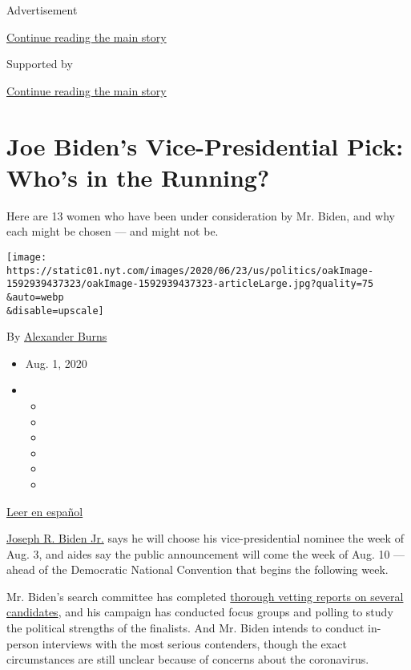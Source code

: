 Advertisement

\protect\hyperlink{after-top}{Continue reading the main story}

Supported by

\protect\hyperlink{after-sponsor}{Continue reading the main story}

\hypertarget{joe-bidens-vice-presidential-pick-whos-in-the-running}{%
\section{Joe Biden's Vice-Presidential Pick: Who's in the
Running?}\label{joe-bidens-vice-presidential-pick-whos-in-the-running}}

Here are 13 women who have been under consideration by Mr. Biden, and
why each might be chosen --- and might not be.

\texttt{[image: https://static01.nyt.com/images/2020/06/23/us/politics/oakImage-1592939437323/oakImage-1592939437323-articleLarge.jpg?quality=75\\\&auto=webp\\\&disable=upscale]}

By \href{https://www.nytimes.com/by/alexander-burns}{Alexander Burns}

\begin{itemize}
\item
  Aug. 1, 2020
\item
  \begin{itemize}
  \item
  \item
  \item
  \item
  \item
  \item
  \end{itemize}
\end{itemize}

\href{https://www.nytimes.com/es/2020/07/29/espanol/estados-unidos/biden-vicepresidente.html}{Leer
en español}

\href{https://www.nytimes.com/interactive/2020/us/elections/joe-biden.html}{Joseph
R. Biden Jr.} says he will choose his vice-presidential nominee the week
of Aug. 3, and aides say the public announcement will come the week of
Aug. 10 --- ahead of the Democratic National Convention that begins the
following week.

Mr. Biden's search committee has completed
\href{https://www.nytimes.com/2020/07/31/us/politics/joseph-biden-vice-president.html}{thorough
vetting reports on several candidates}, and his campaign has conducted
focus groups and polling to study the political strengths of the
finalists. And Mr. Biden intends to conduct in-person interviews with
the most serious contenders, though the exact circumstances are still
unclear because of concerns about the coronavirus.

